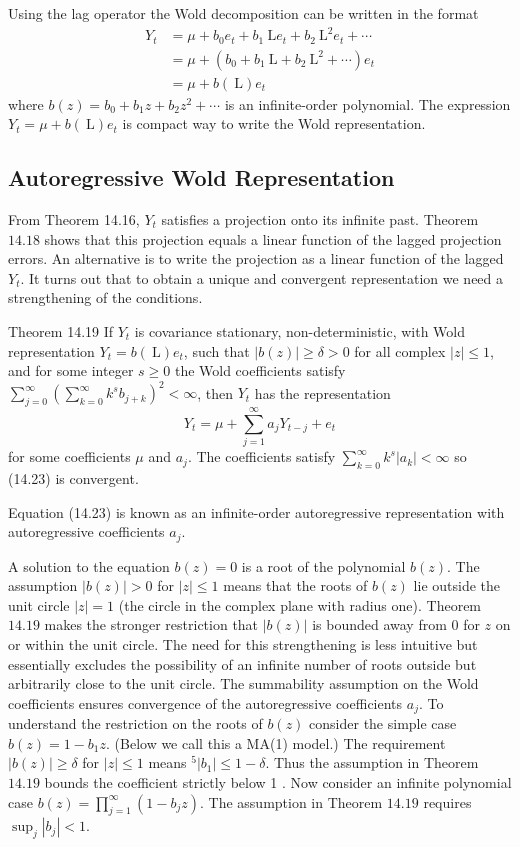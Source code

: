 \documentclass[10pt]{article}
\begin{document}
Using the lag operator the Wold decomposition can be written in the format
$$
\begin{aligned}
Y_{t} &=\mu+b_{0} e_{t}+b_{1} \mathrm{~L} e_{t}+b_{2} \mathrm{~L}^{2} e_{t}+\cdots \\
&=\mu+\left(b_{0}+b_{1} \mathrm{~L}+b_{2} \mathrm{~L}^{2}+\cdots\right) e_{t} \\
&=\mu+b(\mathrm{~L}) e_{t}
\end{aligned}
$$
where $b(z)=b_{0}+b_{1} z+b_{2} z^{2}+\cdots$ is an infinite-order polynomial. The expression $Y_{t}=\mu+b(\mathrm{~L}) e_{t}$ is compact way to write the Wold representation.

\subsection{Autoregressive Wold Representation}
From Theorem 14.16, $Y_{t}$ satisfies a projection onto its infinite past. Theorem $14.18$ shows that this projection equals a linear function of the lagged projection errors. An alternative is to write the projection as a linear function of the lagged $Y_{t}$. It turns out that to obtain a unique and convergent representation we need a strengthening of the conditions.

Theorem 14.19 If $Y_{t}$ is covariance stationary, non-deterministic, with Wold representation $Y_{t}=b(\mathrm{~L}) e_{t}$, such that $|b(z)| \geq \delta>0$ for all complex $|z| \leq 1$, and for some integer $s \geq 0$ the Wold coefficients satisfy $\sum_{j=0}^{\infty}\left(\sum_{k=0}^{\infty} k^{s} b_{j+k}\right)^{2}<\infty$, then $Y_{t}$ has the representation
$$
Y_{t}=\mu+\sum_{j=1}^{\infty} a_{j} Y_{t-j}+e_{t}
$$
for some coefficients $\mu$ and $a_{j}$. The coefficients satisfy $\sum_{k=0}^{\infty} k^{s}\left|a_{k}\right|<\infty$ so (14.23) is convergent.

Equation (14.23) is known as an infinite-order autoregressive representation with autoregressive coefficients $a_{j}$.

A solution to the equation $b(z)=0$ is a root of the polynomial $b(z)$. The assumption $|b(z)|>0$ for $|z| \leq 1$ means that the roots of $b(z)$ lie outside the unit circle $|z|=1$ (the circle in the complex plane with radius one). Theorem $14.19$ makes the stronger restriction that $|b(z)|$ is bounded away from 0 for $z$ on or within the unit circle. The need for this strengthening is less intuitive but essentially excludes the possibility of an infinite number of roots outside but arbitrarily close to the unit circle. The summability assumption on the Wold coefficients ensures convergence of the autoregressive coefficients $a_{j}$. To understand the restriction on the roots of $b(z)$ consider the simple case $b(z)=1-b_{1} z$. (Below we call this a MA(1) model.) The requirement $|b(z)| \geq \delta$ for $|z| \leq 1$ means ${ }^{5}\left|b_{1}\right| \leq 1-\delta$. Thus the assumption in Theorem $14.19$ bounds the coefficient strictly below 1 . Now consider an infinite polynomial case $b(z)=\prod_{j=1}^{\infty}\left(1-b_{j} z\right)$. The assumption in Theorem $14.19$ requires $\sup _{j}\left|b_{j}\right|<1$.
\end{document}
